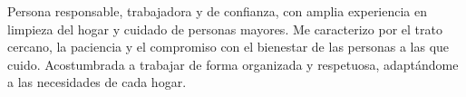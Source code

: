 
\begin{cvparagraph}
    Persona responsable, trabajadora y de confianza, con amplia experiencia en limpieza del hogar y cuidado de personas mayores. Me caracterizo por el trato cercano, la paciencia y el compromiso con el bienestar de las personas a las que cuido. Acostumbrada a trabajar de forma organizada y respetuosa, adaptándome a las necesidades de cada hogar.
\end{cvparagraph}
